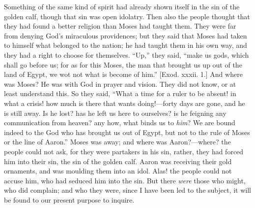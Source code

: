 Something of the same kind of spirit had already shown itself in
the sin of the golden calf, though that sin was open idolatry. Then
also the people thought that they had found a better religion than
Moses had taught them. They were far from denying God's miraculous
providences; but they said that Moses had taken to himself what
belonged to the nation; he had taught them in his own way, and they
had a right to choose for themselves. ``Up,'' they said,
``make us gods, which shall go before us; for as for this Moses,
the man that brought us up out of the land of Egypt, we wot not what
is become of him.'' [Exod. xxxii. 1.] And where was Moses? He was
with God in prayer and vision. They did not know, or at least
understand this. So they said, ``What a time for a ruler to be
absent! in what a crisis! how much is there that wants doing!—forty
days are gone, and he is still away. Is he lost? has he left us here
to ourselves? is he feigning any communication from heaven? any how,
what binds us to \emph{him}? We are bound indeed to the God who has
brought us out of Egypt, but not to the rule of Moses or the line of
Aaron.'' Moses was away; and where was Aaron?—where? the people
could not ask, for they were partakers in his sin, rather, they had
forced him into their sin, the sin of the golden calf. Aaron was
receiving their gold ornaments, and was moulding them into an idol.
Alas! the people could not accuse him, who had seduced him into the
sin. But there \emph{were} those who might, who did complain; and who
they were, since I have been led to the subject, it will be found to
our present purpose to inquire.

